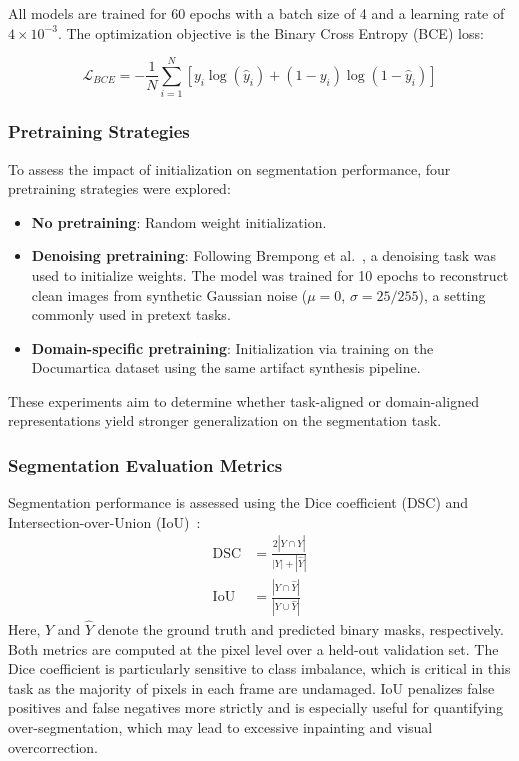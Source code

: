 \documentclass[10pt,a4paper,twocolumn,twoside]{article}
\begin{document}
All models are trained for 60 epochs with a batch size of 4 and a learning rate of $4 \times 10^{-3}$. The optimization objective is the Binary Cross Entropy (BCE) loss:

\begin{equation*}
\mathcal{L}_{BCE} = -\frac{1}{N} \sum_{i=1}^{N} \left[ y_i \log(\hat{y}_i) + (1 - y_i) \log(1 - \hat{y}_i) \right]
\end{equation*}

\subsubsection{Pretraining Strategies}

To assess the impact of initialization on segmentation performance, four pretraining strategies were explored:

\begin{itemize}
    \item \textbf{No pretraining}: Random weight initialization.
    \item \textbf{Denoising pretraining}: Following Brempong et al.~\cite{denoise}, a denoising task was used to initialize weights. The model was trained for 10 epochs to reconstruct clean images from synthetic Gaussian noise ($\mu=0$, $\sigma=25/255$), a setting commonly used in pretext tasks.
    \item \textbf{Domain-specific pretraining}: Initialization via training on the Documartica dataset using the same artifact synthesis pipeline.
\end{itemize}

These experiments aim to determine whether task-aligned or domain-aligned representations yield stronger generalization on the segmentation task.

\subsubsection{Segmentation Evaluation Metrics}

Segmentation performance is assessed using the Dice coefficient (DSC) and Intersection-over-Union (IoU)~\cite{segmetrics}:
\vspace*{-0.9em}
\begin{align*}
    \text{DSC} &= \frac{2 |Y \cap \hat{Y}|}{|Y| + |\hat{Y}|} \\
    \text{IoU} &= \frac{|Y \cap \hat{Y}|}{|Y \cup \hat{Y}|}
\end{align*}
Here, $Y$ and $\hat{Y}$ denote the ground truth and predicted binary masks, respectively. Both metrics are computed at the pixel level over a held-out validation set. The Dice coefficient is particularly sensitive to class imbalance, which is critical in this task as the majority of pixels in each frame are undamaged. IoU penalizes false positives and false negatives more strictly and is especially useful for quantifying over-segmentation, which may lead to excessive inpainting and visual overcorrection.
\end{document}

